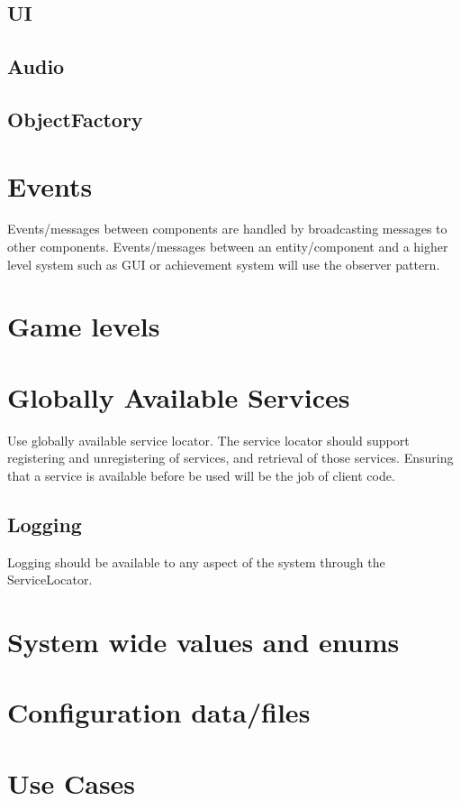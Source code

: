 \documentclass[12pt]{article}
\begin{document}
\subsection{	UI}
\subsection{	Audio}
\subsection{	ObjectFactory}


\section{	Events }
Events/messages between components are handled by broadcasting messages to other components.  Events/messages between an entity/component and a higher level system such as GUI or achievement system will use the observer pattern. 

\section{	Game levels}

\section{ Globally Available Services}
Use globally available service locator.  The service locator should support registering and unregistering of services, and retrieval of those services.  Ensuring that a service is available before be used will be the job of client code.

\subsection{ Logging }
Logging should be available to any aspect of the system through the ServiceLocator.    

\section{	System wide values and enums}

\section{	Configuration data/files}

\section{Use Cases}
\end{document}
